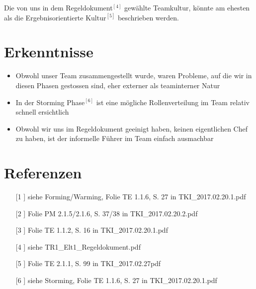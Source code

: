 \documentclass[12pt]{article}
\begin{document}
Die von uns in dem Regeldokument$^{[4]}$ gewählte Teamkultur, könnte am ehesten als die Ergebnisorientierte Kultur$^{[5]}$ beschrieben werden.



\section{Erkenntnisse}
\begin{itemize}
\item Obwohl unser Team zusammengestellt wurde, waren Probleme, auf die wir in diesen Phasen gestossen sind, eher externer als teaminterner Natur
\item In der Storming Phase$^{[6]}$ ist eine mögliche Rollenverteilung im Team relativ schnell ersichtlich
\item Obwohl wir uns im Regeldokument geeinigt haben, keinen eigentlichen Chef zu haben, ist der informelle Führer im Team einfach ausmachbar
\end{itemize}


 \section{Referenzen}
 
 
\begin{itemize}
\item[[1]] siehe Forming/Warming, Folie TE 1.1.6, S. 27 in TKI{\_}2017.02.20.1.pdf
\item[[2]] Folie PM	2.1.5/2.1.6, S. 37/38 in TKI{\_}2017.02.20.2.pdf
\item[[3]] Folie TE 1.1.2, S. 16 in TKI{\_}2017.02.20.1.pdf
\item[[4]] siehe TR1{\_}Elt1{\_}Regeldokument.pdf 
\item[[5]] Folie TE 2.1.1, S. 99 in TKI{\_}2017.02.27pdf
\item[[6]] siehe Storming, Folie TE 1.1.6, S. 27 in TKI{\_}2017.02.20.1.pdf
\end{itemize}
 
\end{document}
